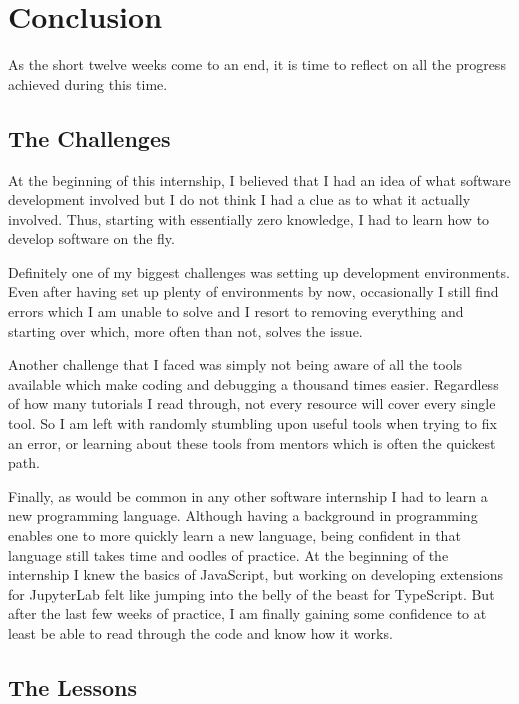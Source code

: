 \chapter{Conclusion}

    As the short twelve weeks come to an end, it is time to reflect on all the progress achieved during this time. 


    \section*{The Challenges}

        At the beginning of this internship, I believed that I had an idea of what software development involved but I do not think I had a clue as to what it actually involved. Thus, starting with essentially zero knowledge, I had to learn how to develop software on the fly. 

        Definitely one of my biggest challenges was setting up development environments. Even after having set up plenty of environments by now, occasionally I still find errors which I am unable to solve and I resort to removing everything and starting over which, more often than not, solves the issue.

        Another challenge that I faced was simply not being aware of all the tools available which make coding and debugging a thousand times easier. Regardless of how many tutorials I read through, not every resource will cover every single tool. So I am left with randomly stumbling upon useful tools when trying to fix an error, or learning about these tools from mentors which is often the quickest path.

        Finally, as would be common in any other software internship I had to learn a new programming language. Although having a background in programming enables one to more quickly learn a new language, being confident in that language still takes time and oodles of practice. At the beginning of the internship I knew the basics of JavaScript, but working on developing extensions for JupyterLab felt like jumping into the belly of the beast for TypeScript. But after the last few weeks of practice, I am finally gaining some confidence to at least be able to read through the code and know how it works.

    \section*{The Lessons}

